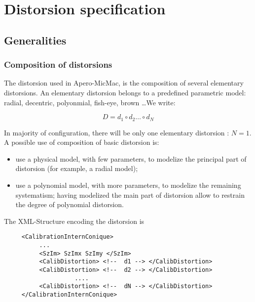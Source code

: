 
\section{Distorsion specification}


\subsection{Generalities}

\subsubsection{Composition of distorsions}
The distorsion used in Apero-MicMac, is the composition of several elementary
distorsions. An elementary distorsion belongs to a predefined parametric model: radial,
decentric, polyonmial, fish-eye, brown \dots We write:

\begin{equation}
    D = d_1 \circ d_2  \dots  \circ d_N
\end{equation}

In majority of configuration, there will be only one elementary distorsion : $N=1$.
A possible use of composition of basic distorsion is:

\begin{itemize}
   \item use a physical model, with few parameters, to modelize the principal
         part of distorsion (for example, a radial model);

   \item use a polynomial model,  with more parameters, to modelize the remaining
         systematism; having modelized the main part of distorsion allow to restrain
         the degree of polynomial distorsion.
\end{itemize}

The XML-Structure encoding the distorsion is

\begin{verbatim}
     <CalibrationInternConique>
          ...
          <SzIm> SzImx SzImy </SzIm>
          <CalibDistortion> <!--  d1 --> </CalibDistortion>
          <CalibDistortion> <!--  d2 --> </CalibDistortion>
                    ....
          <CalibDistortion> <!--  dN --> </CalibDistortion>
     </CalibrationInternConique>
\end{verbatim}

